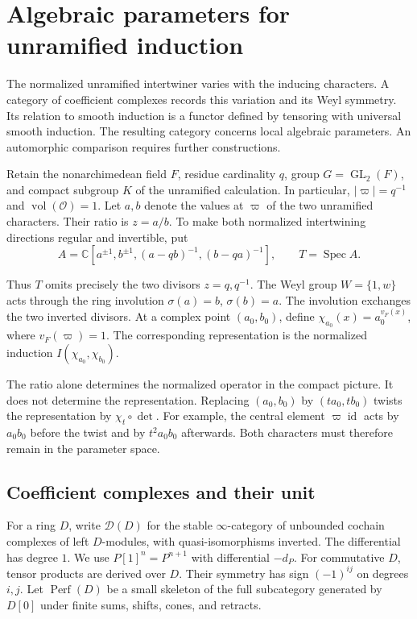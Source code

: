 \section{Algebraic parameters for unramified induction}

The normalized unramified intertwiner varies with the inducing characters.
A category of coefficient complexes records this variation and its Weyl symmetry.
Its relation to smooth induction is a functor defined by tensoring
with universal smooth induction.
The resulting category concerns local algebraic parameters.
An automorphic comparison requires further constructions.

Retain the nonarchimedean field $F$, residue cardinality $q$, group
$G=\operatorname{GL}_2(F)$, and compact subgroup $K$ of the unramified calculation.
In particular, $|\varpi|=q^{-1}$ and $\operatorname{vol}(\mathcal O)=1$.
Let $a,b$ denote the values at $\varpi$ of the two unramified characters.
Their ratio is $z=a/b$.
To make both normalized intertwining directions regular and invertible, put
\[
 A=\mathbb C[a^{\pm1},b^{\pm1},(a-qb)^{-1},(b-qa)^{-1}],
 \qquad T=\operatorname{Spec}A.
\]

Thus $T$ omits precisely the two divisors $z=q,q^{-1}$.
The Weyl group $W=\{1,w\}$ acts through the ring involution
$\sigma(a)=b$, $\sigma(b)=a$.
The involution exchanges the two inverted divisors.
At a complex point $(a_0,b_0)$, define
$\chi_{a_0}(x)=a_0^{v_F(x)}$, where $v_F(\varpi)=1$.
The corresponding representation is the normalized induction
$I(\chi_{a_0},\chi_{b_0})$.

The ratio alone determines the normalized operator in the compact picture.
It does not determine the representation.
Replacing $(a_0,b_0)$ by $(ta_0,tb_0)$ twists the representation by
$\chi_t\circ\det$.
For example, the central element $\varpi\operatorname{id}$ acts by
$a_0b_0$ before the twist and by $t^2a_0b_0$ afterwards.
Both characters must therefore remain in the parameter space.

\subsection{Coefficient complexes and their unit}

For a ring $D$, write $\mathcal D(D)$ for the stable $\infty$-category
of unbounded cochain complexes of left $D$-modules, with quasi-isomorphisms inverted.
The differential has degree $1$.
We use $P[1]^n=P^{n+1}$ with differential $-d_P$.
For commutative $D$, tensor products are derived over $D$.
Their symmetry has sign $(-1)^{ij}$ on degrees $i,j$.
Let $\operatorname{Perf}(D)$ be a small skeleton of the full subcategory
generated by $D[0]$ under finite sums, shifts, cones, and retracts.


